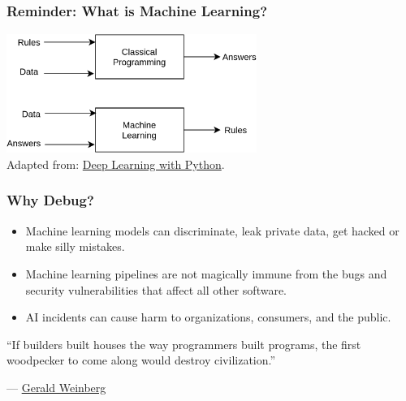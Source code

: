 \documentclass[11pt,
               aspectratio=169,
               hyperref={colorlinks}
               ]{beamer}
\begin{document}
		\subsection*{}

			\begin{frame}
				
				\frametitle{Reminder: What is Machine Learning?}
				
					\begin{center}
						\includegraphics[height=110pt]{../img/ml.png}\\
						\vspace{5pt}
						Adapted from: \href{https://www.manning.com/books/deep-learning-with-python}{Deep Learning with Python}.
					\end{center}

			\end{frame}


			\begin{frame}
				
				\frametitle{Why Debug?}
				
				\begin{itemize}
					
					\item Machine learning models can discriminate, leak private data, get hacked or make silly mistakes.
					
					\item Machine learning pipelines are not magically immune from the bugs and security vulnerabilities that affect all other software.
					
					\item AI incidents can cause harm to organizations, consumers, and the public.
			
				\end{itemize}
			
			\epigraph{“If builders built houses the way programmers built programs, the first woodpecker to come along would destroy civilization.”}{--- \textup{\href{https://en.wikiquote.org/wiki/Gerald_Weinberg}{Gerald Weinberg}}}
				
			\end{frame}
\end{document}
